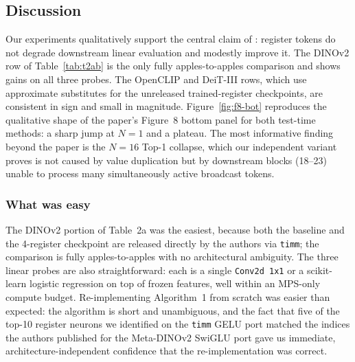 \subsection{Discussion}

Our experiments qualitatively support the central claim of \citet{darcet2024vision}: register tokens do not degrade downstream linear evaluation and modestly improve it. The DINOv2 row of Table~\ref{tab:t2ab} is the only fully apples-to-apples comparison and shows gains on all three probes. The OpenCLIP and DeiT-III rows, which use approximate substitutes for the unreleased trained-register checkpoints, are consistent in sign and small in magnitude. Figure~\ref{fig:f8-bot} reproduces the qualitative shape of the paper's Figure~8 bottom panel for both test-time methods: a sharp jump at $N=1$ and a plateau. The most informative finding beyond the paper is the $N=16$ Top-1 collapse, which our independent variant proves is not caused by value duplication but by downstream blocks (18--23) unable to process many simultaneously active broadcast tokens.

\subsubsection{What was easy}
The DINOv2 portion of Table~2a was the easiest, because both the baseline and the 4-register checkpoint are released directly by the authors via \texttt{timm}; the comparison is fully apples-to-apples with no architectural ambiguity. The three linear probes are also straightforward: each is a single \texttt{Conv2d 1x1} or a scikit-learn logistic regression on top of frozen features, well within an MPS-only compute budget. Re-implementing \citet{jiang2025vision} Algorithm~1 from scratch was easier than expected: the algorithm is short and unambiguous, and the fact that five of the top-10 register neurons we identified on the \texttt{timm} GELU port matched the indices the authors published for the Meta-DINOv2 SwiGLU port gave us immediate, architecture-independent confidence that the re-implementation was correct.

